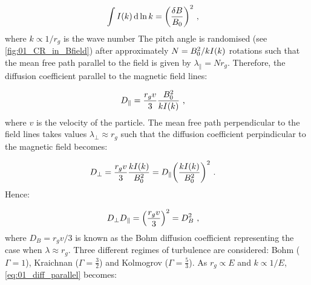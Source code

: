 \begin{equation}
    \begin{aligned}
        \int I\qty(k) \dd{\ln k}&= \qty(\frac{\delta B}{B_0})^2\text{ ,}
    \end{aligned}
\end{equation}
\noindent where $k\propto 1/r_g$ is the wave number  The pitch angle is randomised (see \autoref{fig:01_CR_in_Bfield}) after approximately $N=B_0^2/kI\qty(k)$ rotations such that the mean free path parallel to the field is given by $\lambda_\parallel=Nr_g$. Therefore, the diffusion coefficient parallel to the magnetic field lines:

\begin{equation}
    \begin{aligned}
        D_\parallel&=\frac{r_gv}{3}\frac{B_0^2}{kI\qty(k)}\text{ ,}
    \end{aligned} \label{eq:01_diff_parallel}
\end{equation}
\noindent where $v$ is the velocity of the particle. The mean free path perpendicular to the field lines takes values $\lambda_\perp\approx r_g$ such that the diffusion coefficient perpindicular to the magnetic field becomes:

\begin{equation}
    \begin{aligned}
        D_\perp&=\frac{r_gv}{3}\frac{kI\qty(k)}{B_0^2}=D_\parallel\qty(\frac{kI\qty(k)}{B_0^2})^2\text{ .}
    \end{aligned}
\end{equation}
\noindent Hence:

\begin{equation}
    \begin{aligned}
        D_\perp D_\parallel&=\qty(\frac{r_gv}{3})^2=D_B^2\text{ ,}
    \end{aligned}
\end{equation}
\noindent where $D_B=r_gv/3$ is known as the Bohm diffusion coefficient representing the case when $\lambda\approx r_g$.
\newpar 
Three different regimes of turbulence are considered: Bohm ($\Gamma=1$), Kraichnan ($\Gamma=\frac{3}{2}$) and Kolmogrov ($\Gamma=\frac{5}{3}$). As $r_g\propto E$ and $k\propto 1/E$, \autoref{eq:01_diff_parallel} becomes:

